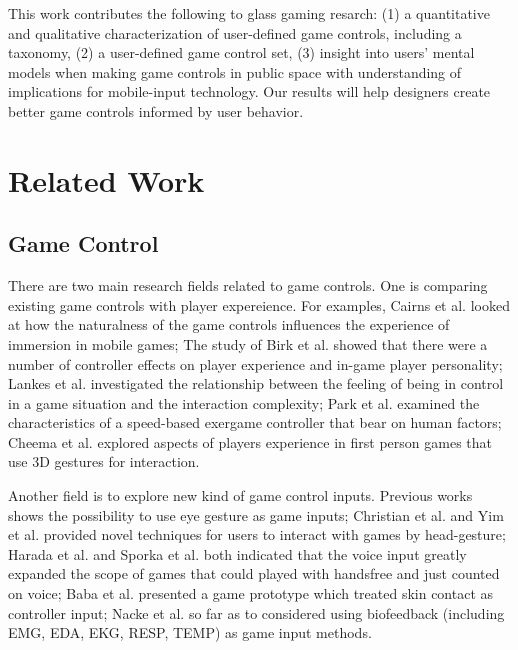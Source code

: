 \documentclass{sigchi}
\begin{document}
This work contributes the following to glass gaming resarch: 
(1) a quantitative and qualitative characterization of user-defined game controls, including a taxonomy, 
(2) a user-defined game control set, 
(3) insight into users' mental models when making game controls in public space with understanding of implications for mobile-input technology. 
Our results will help designers create better game controls informed by user behavior.





\section{Related Work}

    \subsection{Game Control}
    There are two main research fields related to game controls. One is comparing existing game controls with player expereience. For examples, Cairns et al.\cite{Cairns:2014:ICI:2556288.2557345} looked at how the naturalness of the game controls influences the experience of immersion in mobile games; The study of Birk et al.\cite{Birk:2013:CYG:2470654.2470752} showed that there were a number of controller effects on player experience and in-game player personality; Lankes et al.\cite{Lankes:2012:CVC:2367616.2367629} investigated the relationship between the feeling of being in control in a game situation and the interaction complexity; Park et al.\cite{Park:2014:HFS:2556288.2557091} examined the characteristics of a speed-based exergame controller that bear on human factors; Cheema et al.\cite{Cheema:2011:WWT:2159365.2159407} explored aspects of players experience in first person games that use 3D gestures for interaction.

    Another field is to explore new kind of game control inputs. Previous works\cite{Ekman:2008:IEU:1358628.1358820,Vickers:2013:PLT:2531922.2514856,Sundstedt:2010:GGU:1837101.1837106,Smith:2006:UEM:1178823.1178847} shows the possibility to use eye gesture as game inputs; Christian et al.\cite{Christian:2014:VSI:2559206.2580103} and Yim et al.\cite{Yim:2008:EDD:1496984.1497033} provided novel techniques for users to interact with games by head-gesture; Harada et al.\cite{Harada:2011:VGI:2042053.2042059} and Sporka et al. \cite{Sporka:2006:NIS:1168987.1169023} both indicated that the voice input greatly expanded the scope of games that could played with handsfree and just counted on voice; Baba et al.\cite{Baba:2007:VGU:1278280.1278285} presented a game prototype which treated skin contact as controller input; Nacke et al.\cite{Nacke:2011:BGD:1978942.1978958} so far as to considered using biofeedback (including EMG, EDA, EKG, RESP, TEMP) as game input methods.
\end{document}
